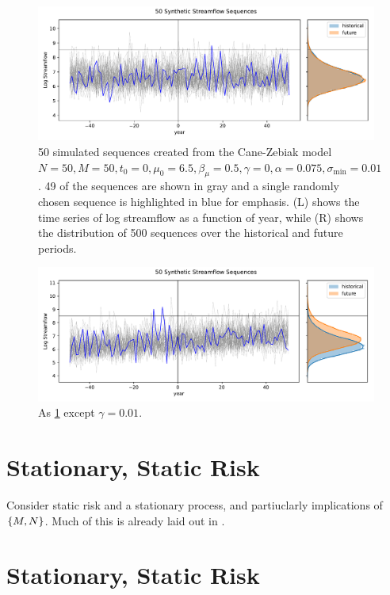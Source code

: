 \documentclass[12pt]{article}
\begin{document}
\begin{figure}
  \includegraphics[width=\textwidth]{../../figs/stationary_sequences.pdf}
  \caption{50 simulated sequences created from the Cane-Zebiak model  \(N=50, M=50, t_0=0, \mu_0=6.5, \beta_\mu=0.5, \gamma=0, \alpha=0.075, \sigma_\text{min}=0.01\). 49 of the sequences are shown in gray and a single randomly chosen sequence is highlighted in blue for emphasis. (L) shows the time series of log streamflow as a function of year, while (R) shows the distribution of 500 sequences over the historical and future periods.}\label{fig:stationary-sequences}
\end{figure}

\begin{figure}
  \includegraphics[width=\textwidth]{../../figs/trend_sequences.pdf}
  \caption{As \cref{fig:stationary-sequences} except \(\gamma=0.01\).}
\end{figure}

\section{Stationary, Static Risk}

Consider static risk and a stationary process, and partiuclarly implications of \(\qty{M, N}\).
Much of this is already laid out in \citet{Lall1987}.

\section{Stationary, Static Risk}
\end{document}
